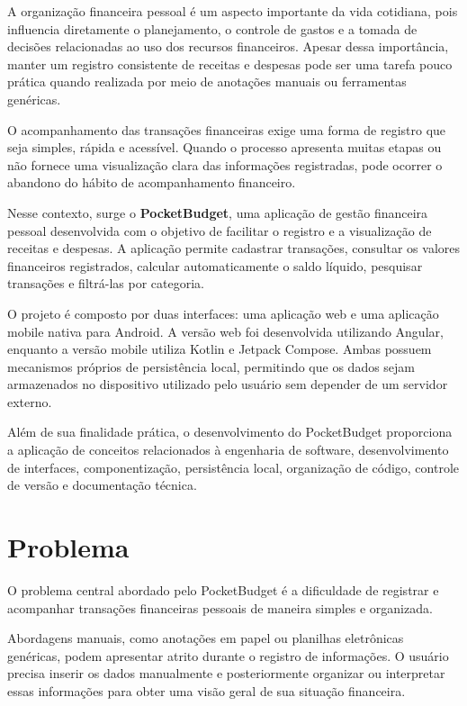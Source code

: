 \documentclass[12pt,a4paper]{article}
\begin{document}
A organização financeira pessoal é um aspecto importante da vida cotidiana, pois influencia diretamente o planejamento, o controle de gastos e a tomada de decisões relacionadas ao uso dos recursos financeiros. Apesar dessa importância, manter um registro consistente de receitas e despesas pode ser uma tarefa pouco prática quando realizada por meio de anotações manuais ou ferramentas genéricas.

O acompanhamento das transações financeiras exige uma forma de registro que seja simples, rápida e acessível. Quando o processo apresenta muitas etapas ou não fornece uma visualização clara das informações registradas, pode ocorrer o abandono do hábito de acompanhamento financeiro.

Nesse contexto, surge o \textbf{PocketBudget}, uma aplicação de gestão financeira pessoal desenvolvida com o objetivo de facilitar o registro e a visualização de receitas e despesas. A aplicação permite cadastrar transações, consultar os valores financeiros registrados, calcular automaticamente o saldo líquido, pesquisar transações e filtrá-las por categoria.

O projeto é composto por duas interfaces: uma aplicação web e uma aplicação mobile nativa para Android. A versão web foi desenvolvida utilizando Angular, enquanto a versão mobile utiliza Kotlin e Jetpack Compose. Ambas possuem mecanismos próprios de persistência local, permitindo que os dados sejam armazenados no dispositivo utilizado pelo usuário sem depender de um servidor externo.

Além de sua finalidade prática, o desenvolvimento do PocketBudget proporciona a aplicação de conceitos relacionados à engenharia de software, desenvolvimento de interfaces, componentização, persistência local, organização de código, controle de versão e documentação técnica.

\section{Problema}
\label{sec:problema-ref}

O problema central abordado pelo PocketBudget é a dificuldade de registrar e acompanhar transações financeiras pessoais de maneira simples e organizada.

Abordagens manuais, como anotações em papel ou planilhas eletrônicas genéricas, podem apresentar atrito durante o registro de informações. O usuário precisa inserir os dados manualmente e posteriormente organizar ou interpretar essas informações para obter uma visão geral de sua situação financeira.
\end{document}
